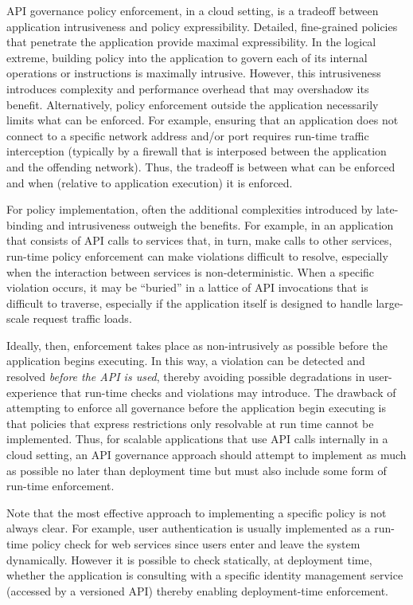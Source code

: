 API governance policy enforcement, in a cloud setting, is a tradeoff between
application intrusiveness and policy expressibility.  Detailed, fine-grained
policies that penetrate the application provide maximal expressibility.
In the logical extreme, building policy into the application to govern each of
its internal operations or instructions is maximally intrusive.  However, this 
intrusiveness
introduces complexity and performance overhead that may overshadow its
benefit.  Alternatively, policy enforcement outside the application
necessarily limits what can be enforced.  For example, ensuring that an
application does not connect to a specific network address and/or port
requires run-time traffic interception (typically by a firewall that is
interposed between the application and the offending network).
Thus, the tradeoff is between what can be enforced and when (relative to
application execution) it is enforced.

For policy implementation, often the additional complexities introduced by
late-binding and intrusiveness outweigh the benefits.  For example, in an
application that consists of API calls to services that, in turn, make calls
to other services, run-time policy enforcement can make violations difficult
to resolve, especially when the interaction between services is
non-deterministic.  When a specific violation occurs, it may be ``buried'' in a
lattice of API invocations that is difficult to traverse, especially if the
application itself is designed to handle large-scale request traffic loads.

Ideally, then, enforcement takes place as non-intrusively as possible before
the application begins executing.  In this way, a violation can be detected and
resolved \textit{before the API is used}, thereby avoiding possible
degradations in user-experience that run-time checks and violations may
introduce.  The drawback of attempting to enforce all governance before the
application begin executing is that policies that express restrictions only
resolvable at run time cannot be implemented.  
Thus, for scalable applications that use API calls internally in a cloud
setting, an API governance approach should attempt to implement as much as
possible no later than deployment time but must also include some form of
run-time enforcement.  

Note that the most effective approach to implementing a specific policy is not
always clear.  For example, user authentication is usually implemented as a
run-time policy check for web services since users enter and leave the system dynamically.
However it is possible to check statically, at deployment time, whether the
application is consulting with a specific identity management service (accessed
by a versioned API) thereby enabling deployment-time enforcement.

